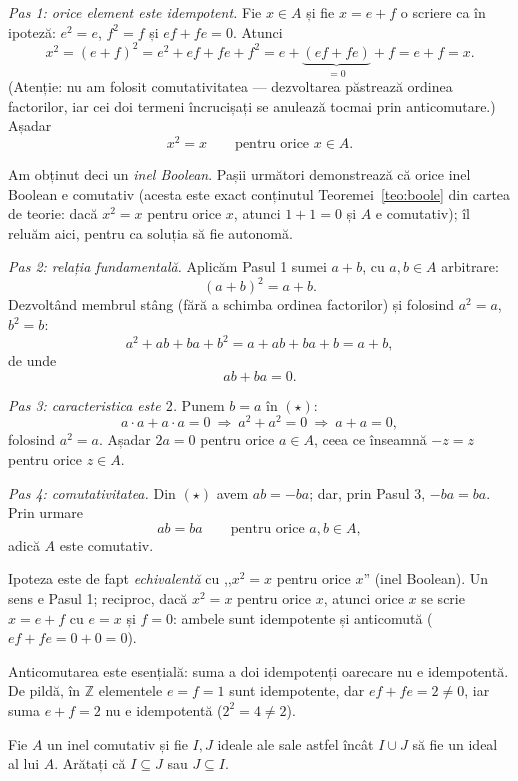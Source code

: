 \begin{solutie}
\textit{Pas 1: orice element este idempotent.} Fie $x\in A$ și fie
$x=e+f$ o scriere ca în ipoteză: $e^{2}=e$, $f^{2}=f$ și
$ef+fe=0$. Atunci
\[
  x^{2}=(e+f)^{2}=e^{2}+ef+fe+f^{2}
       =e+\underbrace{(ef+fe)}_{=0}+f=e+f=x .
\]
(Atenție: nu am folosit comutativitatea --- dezvoltarea păstrează
ordinea factorilor, iar cei doi termeni încrucișați se
anulează tocmai prin anticomutare.) Așadar
\[
  x^{2}=x\qquad\text{pentru orice }x\in A .
\]

\smallskip
Am obținut deci un \emph{inel Boolean}. Pașii următori
demonstrează că orice inel Boolean e comutativ (acesta este exact
conținutul Teoremei~\ref{teo:boole} din cartea de teorie: dacă $x^{2}=x$ pentru
orice $x$, atunci $1+1=0$ și $A$ e comutativ); îl reluăm aici,
pentru ca soluția să fie autonomă.

\smallskip
\textit{Pas 2: relația fundamentală.} Aplicăm Pasul 1 sumei
$a+b$, cu $a,b\in A$ arbitrare:
\[
  (a+b)^{2}=a+b .
\]
Dezvoltând membrul stâng (fără a schimba ordinea factorilor)
și folosind $a^{2}=a$, $b^{2}=b$:
\[
  a^{2}+ab+ba+b^{2}=a+ab+ba+b=a+b ,
\]
de unde
\[
  ab+ba=0 . \tag{$\star$}
\]

\smallskip
\textit{Pas 3: caracteristica este $2$.} Punem $b=a$ în $(\star)$:
\[
  a\cdot a+a\cdot a=0\ \Longrightarrow\ a^{2}+a^{2}=0\ \Longrightarrow\ a+a=0 ,
\]
folosind $a^{2}=a$. Așadar $2a=0$ pentru orice $a\in A$, ceea ce
înseamnă $-z=z$ pentru orice $z\in A$.

\smallskip
\textit{Pas 4: comutativitatea.} Din $(\star)$ avem $ab=-ba$; dar, prin Pasul
3, $-ba=ba$. Prin urmare
\[
  ab=ba\qquad\text{pentru orice }a,b\in A ,
\]
adică $A$ este comutativ.
\end{solutie}

\begin{obs}
Ipoteza este de fapt \emph{echivalentă} cu ,,$x^{2}=x$ pentru orice $x$''
(inel Boolean). Un sens e Pasul 1; reciproc, dacă $x^{2}=x$ pentru orice
$x$, atunci orice $x$ se scrie $x=e+f$ cu $e=x$ și $f=0$: ambele sunt
idempotente și anticomută ($ef+fe=0+0=0$).

Anticomutarea este esențială: suma a doi idempotenți oarecare nu e
idempotentă. De pildă, în $\mathbb{Z}$ elementele $e=f=1$ sunt
idempotente, dar $ef+fe=2\neq 0$, iar suma $e+f=2$ nu e idempotentă
($2^{2}=4\neq 2$).
\end{obs}

\begin{problema}
Fie $A$ un inel comutativ și fie $I,J$ ideale ale sale astfel încât $I \cup J$ să fie un ideal al lui $A$. Arătați că $I \subseteq J$ sau $J \subseteq I$.
\end{problema}

